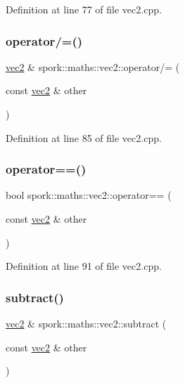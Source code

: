 Definition at line 77 of file vec2.\+cpp.

\mbox{\label{structspork_1_1maths_1_1vec2_a7094862096d511a61623003a63a94dfb}} 
\subsubsection{\texorpdfstring{operator/=()}{operator/=()}}
{\footnotesize\ttfamily \hyperlink{structspork_1_1maths_1_1vec2}{vec2} \& spork\+::maths\+::vec2\+::operator/= (\begin{DoxyParamCaption}\item[{const \hyperlink{structspork_1_1maths_1_1vec2}{vec2} \&}]{other }\end{DoxyParamCaption})}



Definition at line 85 of file vec2.\+cpp.

\mbox{\label{structspork_1_1maths_1_1vec2_ad0fe5fad19950766a3ca03d605e435d1}} 
\subsubsection{\texorpdfstring{operator==()}{operator==()}}
{\footnotesize\ttfamily bool spork\+::maths\+::vec2\+::operator== (\begin{DoxyParamCaption}\item[{const \hyperlink{structspork_1_1maths_1_1vec2}{vec2} \&}]{other }\end{DoxyParamCaption})}



Definition at line 91 of file vec2.\+cpp.

\mbox{\label{structspork_1_1maths_1_1vec2_a0a921e9113514d93f0a4b27956d5d9d6}} 
\subsubsection{\texorpdfstring{subtract()}{subtract()}}
{\footnotesize\ttfamily \hyperlink{structspork_1_1maths_1_1vec2}{vec2} \& spork\+::maths\+::vec2\+::subtract (\begin{DoxyParamCaption}\item[{const \hyperlink{structspork_1_1maths_1_1vec2}{vec2} \&}]{other }\end{DoxyParamCaption})}



